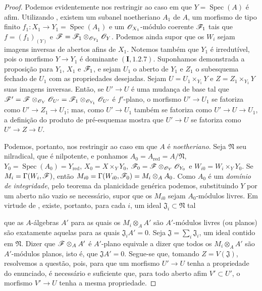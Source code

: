 \begin{proof}
Podemos evidentemente nos
restringir ao caso em que
$Y=\operatorname{Spec}(A)$
é afim. Utilizando
, existem um
subanel noetheriano $A_1$
de $A$, um morfismo de tipo
finito
$f_1:X_1\to
Y_1=\operatorname{Spec}(A_1)$
e um $\mathscr{O}_{X_1}$-módulo
coerente $\mathscr{F}_1$ tais que
$f=(f_1)_{(Y)}$ e
$\mathscr{F}=\mathscr{F}_1
\otimes_{\mathscr{O}_{Y_1}}\mathscr{O}_Y$.
Podemos ainda supor que os
$W_i$ sejam imagens inversas
de abertos afins de $X_1$.
Notemos também que $Y_1$ é
irredutível, pois o morfismo
$Y\to Y_1$ é dominante
$(\mathbf I,1.2.7)$.
Suponhamos demonstrada a
proposição para $Y_1$,
$X_1$ e $\mathscr{F}_1$, e sejam
$U_1$ o aberto de $Y_1$ e
$Z_1$ o subesquema fechado
de $U_1$ com as propriedades
desejadas. Sejam
$U=U_1\times_{Y_1}Y$ e
$Z=Z_1\times_{Y_1}Y$ suas
imagens inversas.
Então, se $U'\to U$ é uma
mudança de base tal que
$\mathscr{F}'=
\mathscr{F}\otimes_{\mathscr{O}_Y}
\mathscr{O}_{U'}=
\mathscr{F}_1\otimes_{\mathscr{O}_{Y_1}}
\mathscr{O}_{U'}$
é $f'$-plano, o morfismo
$U'\to U_1$ se fatoriza como
$U'\to Z_1\to U_1$; mas,
como $U'\to U_1$ também se
fatoriza como
$U'\to U\to U_1$, a
definição do produto de
pré-esquemas mostra que
$U'\to U$ se fatoriza como
$U'\to Z\to U$.

Podemos, portanto, nos
restringir ao caso em que
$A$ é \emph{noetheriano}.
Seja $\mathfrak N$ seu
nilradical, que é nilpotente,
e ponhamos
$A_0=A_{\mathrm{red}}=
A/\mathfrak N$,
$Y_0=\operatorname{Spec}(A_0)
=Y_{\mathrm{red}}$,
$X_0=X\times_YY_0$,
$\mathscr{F}_0=\mathscr{F}
\otimes_{\mathscr{O}_Y}\mathscr{O}_{Y_0}$
e $W_{i0}=W_i\times_YY_0$.
Se $M_i=\Gamma(W_i,\mathscr{F})$,
então
$M_{i0}=
\Gamma(W_{i0},\mathscr{F}_0)
=M_i\otimes_A A_0$.
Como $A_0$ é um
\emph{domínio de integridade}, pelo teorema
da planicidade genérica
 podemos,
substituindo $Y$ por um aberto
não vazio se necessário,
supor que os $M_{i0}$ sejam
$A_0$-módulos livres.
Em virtude de
, existe,
portanto, para cada $i$,
um ideal
$\mathfrak J_i\subset
\mathfrak N$ tal


que as $A$-álgebras $A'$
para as quais os
$M_i\otimes_A A'$ são
$A'$-módulos livres (ou
planos) são exatamente
aquelas para as quais
$\mathfrak J_iA'=0$.
Seja
$\mathfrak J=
\sum_i\mathfrak J_i$,
um ideal contido em
$\mathfrak N$.
Dizer que
$\mathscr{F}\otimes_A A'$ é
$A'$-plano equivale a dizer
que todos os
$M_i\otimes_A A'$ são
$A'$-módulos planos, isto é,
que $\mathfrak JA'=0$.
Segue-se que, tomando
$Z=V(\mathfrak J)$,
resolvemos a questão, pois,
para que um morfismo
$U'\to U$ tenha a
propriedade do enunciado,
é necessário e suficiente
que, para todo aberto afim
$V'\subset U'$, o morfismo
$V'\to U$ tenha a mesma
propriedade.
\end{proof}

